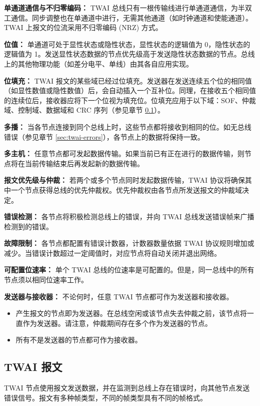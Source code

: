 \documentclass[main\_\_CN.tex]{subfiles}
\begin{document}
{\bfseries 单通道通信与不归零编码：} TWAI 总线只有一根传输线进行单通道通信，为半双工通信。同步调整也在单通道中进行，无需其他通道（如时钟通道和使能通道）。TWAI 上报文的位流采用不归零编码 (NRZ) 方式。

{\bfseries 位值：} 单通道可处于显性状态或隐性状态，显性状态的逻辑值为 0，隐性状态的逻辑值为 1。发送显性状态数据的节点优先级高于发送隐性状态数据的节点。总线上的其他物理功能（如差分电平、单线）由其各自应用实现。

{\bfseries 位填充：} TWAI 报文的某些域已经过位填充。发送器在发送连续五个位的相同值（如显性数值或隐性数值）后，会自动插入一个互补位。同理，在接收五个相同值的连续位后，接收器应将下一个位视为填充位。位填充应用于以下域：SOF、仲裁域、控制域、数据域和 CRC 序列（参见章节 \ref{sec:twai-messages}）。

{\bfseries 多播：} 当各节点连接到同个总线上时，这些节点都将接收到相同的位。如无总线错误（参见章节 \ref{sec:twai-errors}），各节点上的数据将保持一致。

{\bfseries 多主机：} 任意节点都可发起数据传输。如果当前已有正在进行的数据传输，则节点将在当前传输结束后再发起新的数据传输。

{\bfseries 报文优先级与仲裁：} 若两个或多个节点同时发起数据传输，TWAI 协议将确保其中一个节点获得总线的优先仲裁权。优先仲裁权由各节点所发送报文的仲裁域决定。

{\bfseries 错误检测：} 各节点将积极检测总线上的错误，并向 TWAI 总线发送错误帧来广播检测到的错误。

{\bfseries 故障限制：} 各节点都配置有错误计数器，计数器数量依据 TWAI 协议规则增加或减少。当错误计数超过一定阈值时，对应节点将自动关闭并退出网络。

{\bfseries 可配置位速率：} 单个 TWAI 总线的位速率是可配置的。但是，同一总线中的所有节点须以相同位速率工作。

{\bfseries 发送器与接收器：} 不论何时，任意 TWAI 节点都可作为发送器和接收器。
\begin{itemize}
    \item 产生报文的节点即为发送器。在总线空闲或该节点失去仲裁之前，该节点将一直作为发送器。请注意，仲裁期间存在多个作为发送器的节点。
    \item 所有不是发送器的节点都可作为接收器。
\end{itemize}

\subsection{TWAI 报文}
\label{sec:twai-messages}
TWAI 节点使用报文发送数据，并在监测到总线上存在错误时，向其他节点发送错误信号。报文有多种帧类型，不同的帧类型具有不同的帧格式。
\end{document}
